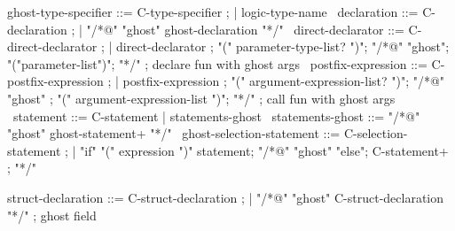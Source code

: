 \begin{syntax}

  ghost-type-specifier ::= C-type-specifier ;
  | {logic-type-name} \
  declaration ::= C-declaration ;
  | "/*@" "ghost" ghost-declaration "*/" \
  direct-declarator ::= C-direct-declarator ;
    | direct-declarator ;
    "(" parameter-type-list? ")";
        {"/*@" "ghost"};
          {"("parameter-list")"};
          {"*/"} ; declare fun with ghost args
        \
  postfix-expression ::= C-postfix-expression ;
    | postfix-expression ;
     "(" argument-expression-list? ")";
     {"/*@" "ghost"} ;
     {  "(" argument-expression-list ")"};
     {  "*/"} ; call fun with ghost args
    \
  statement ::= C-statement | statements-ghost \
  statements-ghost ::= "/*@" "ghost" ghost-statement+ "*/" \
  ghost-selection-statement ::= C-selection-statement ;
    | "if" "(" expression ")" statement;
      {"/*@" "ghost" "else"};
      {  C-statement+ };
      {  "*/"} \

  struct-declaration ::= C-struct-declaration ;
  | {"/*@" "ghost" C-struct-declaration "*/"} ; ghost field

\end{syntax}


